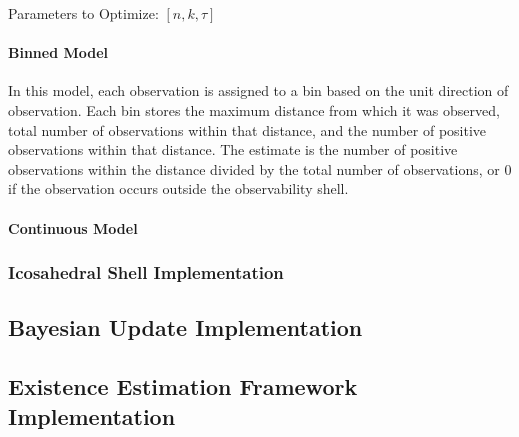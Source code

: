 Parameters to Optimize: $[n, k, \tau]$

\paragraph{Binned Model}

In this model, each observation is assigned to a bin based on the unit direction of observation. Each bin stores the maximum distance from which it was observed, total number of observations within that distance, and the number of positive observations within that distance. The estimate is the number of positive observations within the distance divided by the total number of observations, or 0 if the observation occurs outside the observability shell.

\paragraph{Continuous Model}

\subsubsection{Icosahedral Shell Implementation}
\label{sec:icos_construction}

\subsection{Bayesian Update Implementation}

\subsection{Existence Estimation Framework Implementation}